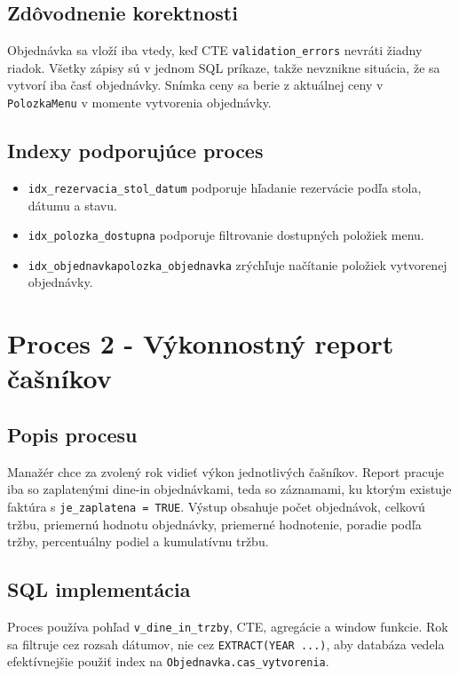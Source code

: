 \documentclass[11pt, a4paper]{article}
\begin{document}
\subsection*{Zdôvodnenie korektnosti}

Objednávka sa vloží iba vtedy, keď CTE \texttt{validation\_errors} nevráti žiadny riadok. Všetky
zápisy sú v jednom SQL príkaze, takže nevznikne situácia, že sa vytvorí iba časť objednávky.
Snímka ceny sa berie z aktuálnej ceny v \texttt{PolozkaMenu} v momente vytvorenia objednávky.

\subsection*{Indexy podporujúce proces}

\begin{itemize}
    \item \texttt{idx\_rezervacia\_stol\_datum} podporuje hľadanie rezervácie podľa stola, dátumu a stavu.
    \item \texttt{idx\_polozka\_dostupna} podporuje filtrovanie dostupných položiek menu.
    \item \texttt{idx\_objednavkapolozka\_objednavka} zrýchľuje načítanie položiek vytvorenej objednávky.
\end{itemize}

\section{Proces 2 - Výkonnostný report čašníkov}

\subsection*{Popis procesu}

Manažér chce za zvolený rok vidieť výkon jednotlivých čašníkov. Report pracuje iba so zaplatenými
dine-in objednávkami, teda so záznamami, ku ktorým existuje faktúra s
\texttt{je\_zaplatena = TRUE}. Výstup obsahuje počet objednávok, celkovú tržbu, priemernú hodnotu
objednávky, priemerné hodnotenie, poradie podľa tržby, percentuálny podiel a kumulatívnu tržbu.

\subsection*{SQL implementácia}

Proces používa pohľad \texttt{v\_dine\_in\_trzby}, CTE, agregácie a window funkcie. Rok sa filtruje
cez rozsah dátumov, nie cez \texttt{EXTRACT(YEAR ...)}, aby databáza vedela efektívnejšie použiť
index na \texttt{Objednavka.cas\_vytvorenia}.
\end{document}

